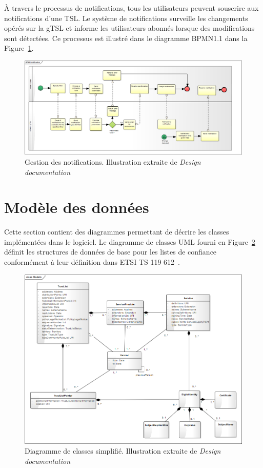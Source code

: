 \documentclass{tnreport}
\begin{document}
À travers le processus de notifications, tous les utilisateurs peuvent souscrire aux notifications d'une TSL. Le système de notifications surveille les changements opérés sur la gTSL et informe les utilisateurs abonnés lorsque des modifications sont détectées. Ce processus est illustré dans le diagramme BPMN1.1 dans la Figure~\ref{fig:notification-flow}.

\begin{figure}[h]
	\centering
	\includegraphics[scale=0.33]{figures/notification-flow}
	\caption{Gestion des notifications. Illustration extraite de \textit{Design documentation}~\cite{design-document}}
	\label{fig:notification-flow}
\end{figure}

\section{Modèle des données}

Cette section contient des diagrammes permettant de décrire les classes implémentées dans le logiciel. Le diagramme de classes UML fourni en Figure~\ref{fig:model} définit les structures de données de base pour les listes de confiance conformément à leur définition dans ETSI TS 119 612~\cite{ETSITS119612}.

\begin{figure}[h]
	\centering
	\includegraphics[scale=0.51]{figures/model}
	\caption{Diagramme de classes simplifié. Illustration extraite de \textit{Design documentation}~\cite{design-document}}
	\label{fig:model}
\end{figure}
\end{document}
